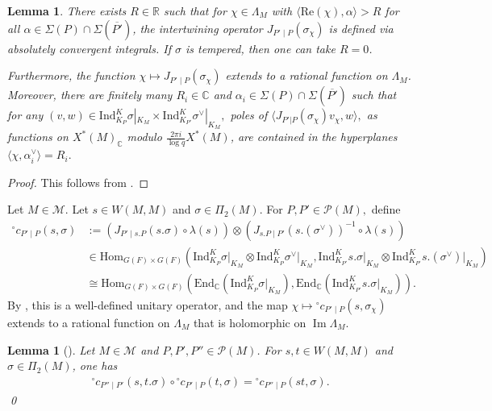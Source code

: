 \documentclass[10pt]{amsart}
\newtheorem{lemma}[theorem]{Lemma}
\theoremstyle{definition}
\numberwithin{equation}{section}
\numberwithin{equation}{subsection}
\newcommand{\Ind}{\mathrm{Ind}}
\newcommand{\RR}{\mathbb{R}}
\newcommand{\CC}{\mathbb{C}}
\renewcommand{\Im}{\mathop{\mathrm{Im}}}
\begin{document}
\begin{lemma}\label{lem:J} There exists $R\in\RR$ such that for $\chi\in\Lambda_M$ with $\langle\mathrm{Re}(\chi),\alpha\rangle>R$ for all $\alpha\in\Sigma(P)\cap\Sigma(\overline{P'})$, the intertwining operator $J_{P'\mid P}(\sigma_\chi)$ is defined via absolutely convergent integrals. If $\sigma$ is tempered, then one can take $R=0$.

Furthermore, the function $\chi\mapsto J_{P'\mid P}(\sigma_\chi)$ extends to a rational function on $\Lambda_M$. Moreover, there are finitely many $R_i\in \CC$ and $\alpha_i\in \Sigma(P)\cap \Sigma(\overline{P'})$ such that for any $(v,w)\in \Ind_{K_P}^K\sigma|_{K_M}\times \Ind_{K_{P'}}^K\sigma^\lor|_{K_M},$ poles of $\langle J_{P'|P}(\sigma_\chi)v_\chi,w\rangle,$ as functions on $X^\ast(M)_\CC$ modulo $\tfrac{2\pi i}{\log q}X^\ast(M)$, are contained in the hyperplanes $\langle \chi,\alpha_i^\lor\rangle=R_i.$
\end{lemma}
\begin{proof} 
This follows from \cite[Th\'eor\`eme IV.1.1 and Proposition IV.2.1]{Waldspurger:Plancherel}.     
\end{proof}


Let $M\in \mathcal{M}.$ Let $s\in W(M,M)$ and $\sigma\in\Pi_2(M)$. For $P,P'\in \mathcal{P}(M),$ define 
\begin{align*}
    {}^\circ c_{P'\mid P}(s,\sigma) &:= (J_{P'\mid s.P}(s.\sigma)\circ \lambda(s))\otimes (J_{s.P\mid P'}(s.(\sigma^\vee))^{-1}\circ \lambda(s))\\
    &\in \mathrm{Hom}_{G(F)\times G(F)} \left(\Ind_{K_P}^K\sigma\vert_{K_M}\otimes  \Ind_{K_P}^K \sigma^\lor|_{K_M},\Ind_{K_{P'}}^Ks.\sigma\vert_{K_{M}}\otimes\Ind_{K_{P'}}^Ks.(\sigma^\lor)\vert_{K_{M}}\right)\\
    &\cong  \mathrm{Hom}_{G(F)\times G(F)} \left(\mathrm{End}_\CC(\Ind_{K_P}^K\sigma\vert_{K_M}),\mathrm{End}_\CC(\Ind_{K_{P'}}^Ks.\sigma\vert_{K_{M}})\right).
\end{align*}
By \cite[Lemme V.3.1]{Waldspurger:Plancherel}, this is a well-defined unitary operator, and the map $\chi\mapsto {}^\circ c_{P'\mid P}(s,\sigma_\chi)$ extends to a rational function on $\Lambda_M$ that is holomorphic on $\Im\Lambda_M$. 

\begin{lemma}[{\cite[Lemme V.3.2]{Waldspurger:Plancherel}}]\label{oc:cocycle} Let $M\in \mathcal{M}$ and $P,P',P''\in \mathcal{P}(M)$. For $s,t\in W(M,M)$ and $\sigma\in \Pi_2(M)$, one has
\begin{align*}
    ^\circ c_{P''\mid P'}(s,t.\sigma)\circ{}^\circ c_{P'\mid P}(t,\sigma) = {}^\circ c_{P''\mid P}(st,\sigma).
\end{align*}\qed
\end{lemma}
\end{document}
